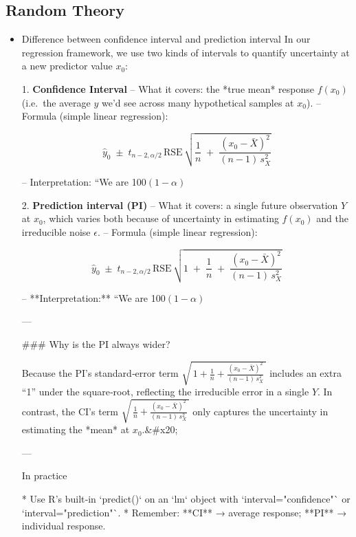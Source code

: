 \documentclass{article}
\begin{document}
\subsection{Random Theory}
\begin{itemize}
    \item Difference between confidence interval and prediction interval
    In our regression framework, we use two kinds of intervals to quantify uncertainty at a new predictor value $x_0$:

1. \textbf{Confidence Interval}
   – What it covers: the *true mean* response $f(x_0)$ (i.e.\ the average $y$ we’d see across many hypothetical samples at $x_0$).
   – Formula (simple linear regression):

   $$
     \hat y_0 \;\pm\; t_{n-2,\alpha/2}\,\mathrm{RSE}\,\sqrt{\frac{1}{n}\;+\;\frac{(x_0 - \bar X)^2}{(n-1)\,s_X^2}}
   $$

   – Interpretation: “We are 100$(1-\alpha)$%

2. \textbf{Prediction interval (PI)}
   – What it covers: a single future observation $Y$ at $x_0$, which varies both because of uncertainty in estimating $f(x_0)$ and the irreducible noise $\epsilon$.
   – Formula (simple linear regression):

   $$
     \hat y_0 \;\pm\; t_{n-2,\alpha/2}\,\mathrm{RSE}\,\sqrt{1 \;+\;\frac{1}{n}\;+\;\frac{(x_0 - \bar X)^2}{(n-1)\,s_X^2}}
   $$

   – **Interpretation:** “We are 100$(1-\alpha)$%

---

### Why is the PI always wider?

Because the PI’s standard‐error term
$\sqrt{\,1 + \frac1n + \frac{(x_0 - \bar X)^2}{(n-1)\,s_X^2}\,}$
includes an extra “1” under the square‐root, reflecting the irreducible error in a single $Y$. In contrast, the CI’s term
$\sqrt{\,\frac1n + \frac{(x_0 - \bar X)^2}{(n-1)\,s_X^2}\,}$
only captures the uncertainty in estimating the *mean* at $x_0$.&#x20;

---

In practice

* Use R’s built‐in `predict()` on an `lm` object with `interval="confidence"` or `interval="prediction"`.
* Remember: **CI** → average response; **PI** → individual response.

\end{itemize}
\pagebreak
\end{document}

